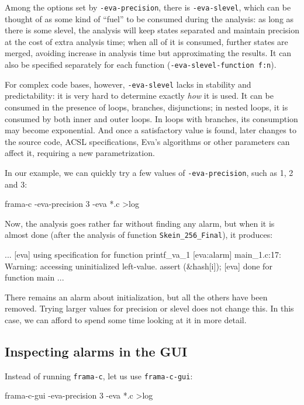 \documentclass[web]{frama-c-book}
\newcommand{\Eva}{\textsf{Eva}}
\begin{document}
Among the options set by \verb|-eva-precision|, there is \verb|-eva-slevel|,
which can be thought of as some kind of ``fuel''
to be consumed during the analysis: as long as there is some slevel,
the analysis will keep states separated and maintain precision at the cost of
extra analysis time; when all of
it is consumed, further states are merged, avoiding increase in analysis time
but approximating the results. It can also be
specified separately for each function (\verb|-eva-slevel-function f:n|).

For complex code bases, however, \verb|-eva-slevel| lacks in stability and
predictability: it is very hard to determine exactly {\em how} it is used.
It can be consumed in the presence of loops, branches, disjunctions;
in nested loops, it is consumed by both inner and outer loops.
In loops with branches, its consumption may become exponential.
And once a satisfactory value is found, later changes to the source code,
ACSL specifications, \Eva{}'s algorithms or other parameters can affect it,
requiring a new parametrization.

In our example, we can quickly try a few values of \verb|-eva-precision|,
such as 1, 2 and 3:

\begin{shell}
frama-c -eva-precision 3 -eva *.c >log
\end{shell}

Now, the analysis goes rather far without finding any alarm,
but when it is almost done (after the analysis of function
\lstinline|Skein_256_Final|), it produces:
\begin{logs}
...
[eva] using specification for function printf_va_1
[eva:alarm] main_1.c:17: Warning: 
  accessing uninitialized left-value. assert \initialized(&hash[i]);
[eva] done for function main
...
\end{logs}

There remains an alarm about initialization, but all the others have been
removed. Trying larger values for precision or slevel does not change this.
In this case, we can afford to spend some time looking at it in more detail.

\subsection{Inspecting alarms in the GUI}

Instead of running \verb|frama-c|, let us use \verb|frama-c-gui|:

\begin{shell}
frama-c-gui -eva-precision 3 -eva *.c >log
\end{shell}
\end{document}
